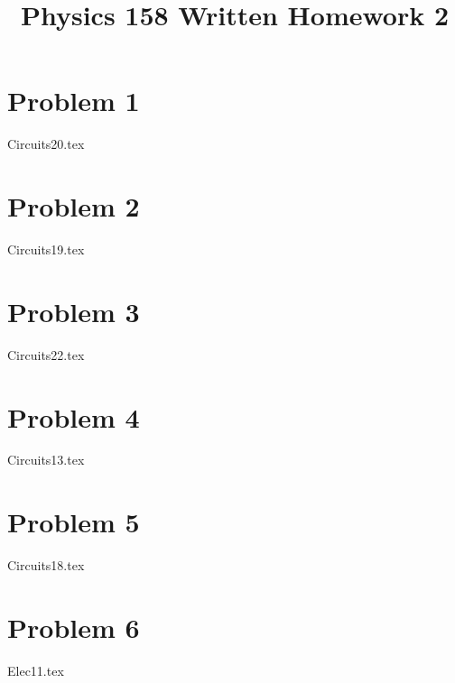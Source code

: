 \documentclass[11pt, fleqn]{article}
\title{Physics 158 Written Homework 2}
\author{}
\date{}
\begin{document}
\allowdisplaybreaks

\maketitle

\section*{Problem 1}
{Circuits20.tex}
\section*{Problem 2}
{Circuits19.tex}
\section*{Problem 3}
{Circuits22.tex}
\section*{Problem 4}
{Circuits13.tex}
\section*{Problem 5}
{Circuits18.tex}
\section*{Problem 6}
{Elec11.tex}
\end{document}

